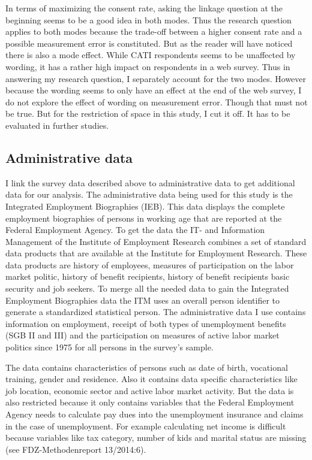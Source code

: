 In terms of maximizing the consent rate, asking the linkage question at the beginning seems to be a good idea in both modes. Thus the research question applies to both modes because the trade-off between a higher
consent rate and a possible measurement error is constituted. But as the reader will have noticed there is also a mode effect. While CATI respondents seems to be unaffected by wording, it has a rather high impact on respondents in a web survey. Thus in answering my research question, I separately account for the two modes. However because the wording seems to only have an effect at the end of the web survey, I do not explore the effect of wording on measurement error. Though that must not be true. But for the restriction of space in this study, I cut it off. It has to be evaluated in further studies.


\subsection{Administrative data}\label{admin}

I link the survey data described above to administrative data to get additional data for our analysis. The administrative data being used for this study is the Integrated Employment Biographies (IEB). This data displays the complete employment biographies of persons in working age that are reported at the Federal Employment Agency. To get the data the IT- and Information Management of the Institute of Employment Research combines a set of standard data products that are available at the Institute for Employment Research. These data products are history of employees, measures of participation on the labor market politic, history of benefit recipients, history of benefit recipients basic security and job seekers. To merge all the needed data to gain the Integrated Employment Biographies data the ITM uses an overall person identifier to generate a standardized statistical person. The administrative data I use contains information on employment, receipt of both types of unemployment benefits (SGB II and III) and the participation on measures of active labor market politics since 1975 for all persons in the survey's sample.

The data contains characteristics of persons such as date of birth, vocational training, gender and residence. Also it contains data specific characteristics like job location, economic sector and active labor market activity. But the data is also restricted because it only contains variables that the Federal Employment Agency needs to calculate pay dues into the unemployment insurance and claims in the case of unemployment. For example calculating net income is difficult because variables like tax category, number of kids and marital status are missing (see FDZ-Methodenreport 13/2014:6). 

